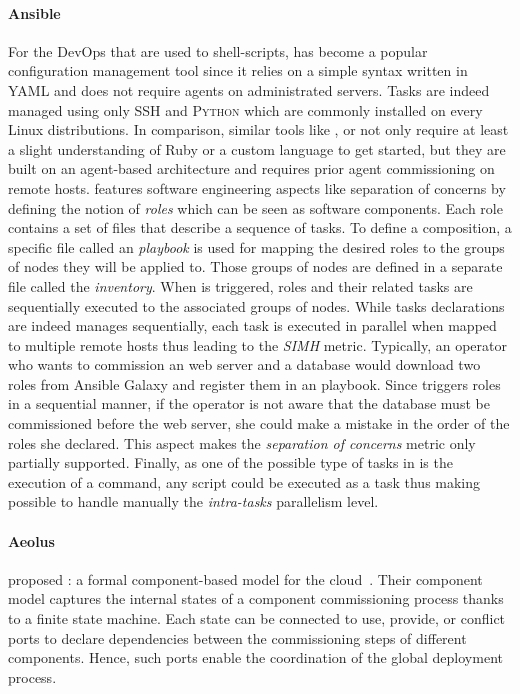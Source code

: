\paragraph{Ansible}
For the DevOps that are used to shell-scripts, \ansible has become a
popular configuration management tool since it relies on a simple
syntax written in YAML and does not require agents on administrated
servers. Tasks are indeed managed using only \textsc{SSH} and
\textsc{Python} which are commonly installed on every Linux
distributions.  In comparison, similar tools like \chef, \puppet or
\cfengine not only require at least a slight understanding of Ruby or
a custom language to get started, but they are built on an agent-based
architecture and requires prior agent commissioning on remote hosts.
\ansible features software engineering aspects like separation of
concerns by defining the notion of \emph{roles} which can be seen as
software components.  Each role contains a set of files that describe
a sequence of tasks. To define a composition, a specific file called
an \ansible \emph{playbook} is used for mapping the desired roles to
the groups of nodes they will be applied to. Those groups of nodes are
defined in a separate file called the \emph{inventory}. When \ansible
is triggered, roles and their related tasks are sequentially executed
to the associated groups of nodes. While tasks declarations are indeed
manages sequentially, each task is executed in parallel when mapped to
multiple remote hosts thus leading to the \emph{SIMH} metric.
Typically, an operator who wants to commission an \apache web server
and a \mysql database would download two roles from Ansible Galaxy and
register them in an playbook. Since \ansible triggers roles in a
sequential manner, if the operator is not aware that the database must
be commissioned before the web server, she could make a mistake in the
order of the roles she declared. This aspect makes the
\emph{separation of concerns} metric only partially
supported. Finally, as one of the possible type of tasks in \ansible
is the execution of a \shell command, any script could be executed as
a task thus making possible to handle manually the \emph{intra-tasks}
parallelism level.


\paragraph{Aeolus}
\citeauthor{dicosmo2014ic} proposed \aeolus: a formal component-based
model for the cloud~\cite{dicosmo2014ic}. Their component model
captures the internal states of a component commissioning process
thanks to a finite state machine. Each state can be connected to use,
provide, or conflict ports to declare dependencies between the
commissioning steps of different components. Hence, such ports enable
the coordination of the global deployment process.

